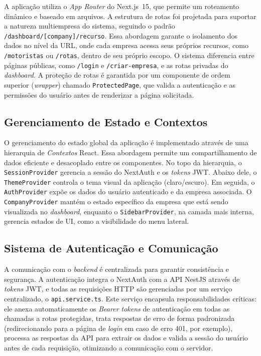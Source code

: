 A aplicação utiliza o \textit{App Router} do Next.js~15, que permite um roteamento dinâmico e baseado em arquivos. A estrutura de rotas foi projetada para suportar a natureza multiempresa do sistema, seguindo o padrão \texttt{/dashboard/[company]/recurso}. Essa abordagem garante o isolamento dos dados no nível da URL, onde cada empresa acessa seus próprios recursos, como \texttt{/motoristas} ou \texttt{/rotas}, dentro de seu próprio escopo. O sistema diferencia entre páginas públicas, como \texttt{/login} e \texttt{/criar-empresa}, e as rotas privadas do \textit{dashboard}. A proteção de rotas é garantida por um componente de ordem superior (\textit{wrapper}) chamado \texttt{ProtectedPage}, que valida a autenticação e as permissões do usuário antes de renderizar a página solicitada.

\subsection{Gerenciamento de Estado e Contextos}

O gerenciamento do estado global da aplicação é implementado através de uma hierarquia de \textit{Contextos} React. Essa abordagem permite um compartilhamento de dados eficiente e desacoplado entre os componentes. No topo da hierarquia, o \texttt{SessionProvider} gerencia a sessão do NextAuth e os \textit{tokens} JWT. Abaixo dele, o \texttt{ThemeProvider} controla o tema visual da aplicação (claro/escuro). Em seguida, o \texttt{AuthProvider} expõe os dados do usuário autenticado e da empresa associada. O \texttt{CompanyProvider} mantém o estado específico da empresa que está sendo visualizada no \textit{dashboard}, enquanto o \texttt{SidebarProvider}, na camada mais interna, gerencia estados de UI, como a visibilidade do menu lateral.

\subsection{Sistema de Autenticação e Comunicação}

A comunicação com o \textit{backend} é centralizada para garantir consistência e segurança. A autenticação integra o NextAuth com a API NestJS através de \textit{tokens} JWT, e todas as requisições HTTP são gerenciadas por um serviço centralizado, o \texttt{api.service.ts}. Este serviço encapsula responsabilidades críticas: ele anexa automaticamente os \textit{Bearer tokens} de autenticação em todas as chamadas a rotas protegidas, trata respostas de erro de forma padronizada (redirecionando para a página de \textit{login} em caso de erro 401, por exemplo), processa as respostas da API para extrair os dados e valida a sessão do usuário antes de cada requisição, otimizando a comunicação com o servidor.

